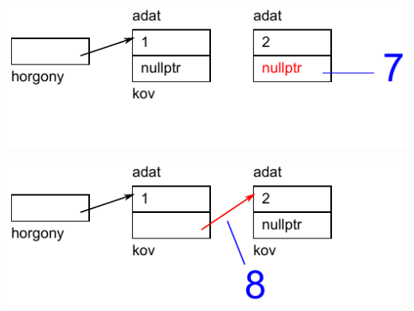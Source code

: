 \begin{frame}
  \begin{center}
    \includegraphics[scale=0.6]{lista1/list1-07.pdf}
  \end{center}
  \vspace{-.2cm}
  \begin{exampleblock}{}
    \vspace{-.2cm}
    
    \vspace{-.2cm}
  \end{exampleblock}
\end{frame}

\begin{frame}
  \begin{center}
    \includegraphics[scale=0.6]{lista1/list1-08.pdf}
  \end{center}
  \vspace{-.2cm}
  \begin{exampleblock}{}
    \vspace{-.2cm}
    
    \vspace{-.2cm}
  \end{exampleblock}
\end{frame}